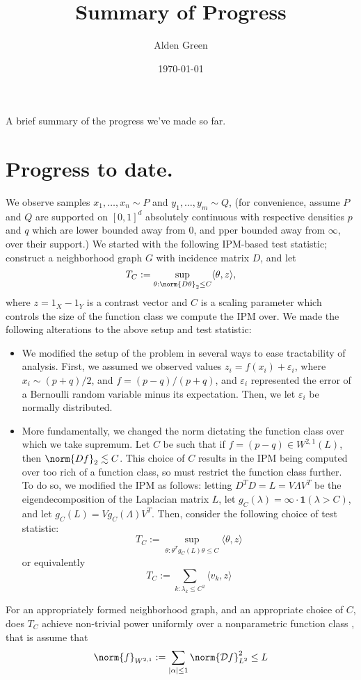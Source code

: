 \documentclass{article}
\newcommand{\abs}[1]{\left \lvert #1 \right \rvert}
\newcommand{\dotp}[2]{\langle #1, #2 \rangle}
\newcommand{\1}{\mathbf{1}}
\newcommand{\Partial}{\mathcal{D}}
\theoremstyle{alden}
\theoremstyle{aldenthm}
\theoremstyle{definition}
\theoremstyle{remark}
\begin{document}
\title{Summary of Progress}
\author{Alden Green}
\date{\today}
\maketitle

A brief summary of the progress we've made so far.
\section{Progress to date.}
We observe samples $x_1,\ldots,x_n \sim P$ and $y_1,\ldots,y_m \sim Q$, (for convenience, assume $P$ and $Q$ are supported on $[0,1]^d$ absolutely continuous with respective densities $p$ and $q$ which are lower bounded away from $0$, and pper bounded away from $\infty$, over their support.) We started with the following IPM-based test statistic; construct a neighborhood graph $G$ with incidence matrix $D$, and let
\begin{equation*}
T_C := \sup_{\theta: \norm{D\theta}_2 \leq C} \dotp{\theta}{z},
\end{equation*}
where $z = 1_X - 1_Y$ is a contrast vector and $C$ is a scaling parameter which controls the size of the function class we compute the IPM over. We made the following alterations to the above setup and test statistic:
\begin{itemize}
	\item We modified the setup of the problem in several ways to ease tractability of analysis. First, we assumed we observed values $z_i = f(x_i) + \varepsilon_i$, where $x_i \sim (p + q)/2$, and $f = (p - q)/(p + q)$, and $\varepsilon_i$ represented the error of a Bernoulli random variable minus its expectation. Then, we let $\varepsilon_i$ be normally distributed. 
	
	\item More fundamentally, we changed the norm dictating the function class over which we take supremum. Let $C$ be such that if $f = (p - q) \in W^{2,1}(L)$, then $\norm{Df}_2 \lesssim C$. This choice of $C$ results in the IPM being computed over too rich of a function class, so must restrict the function class further. To do so, we modified the IPM as follows: letting $D^T D = L = V \Lambda V^T$ be the eigendecomposition of the Laplacian matrix $L$, let $g_C(\lambda) = \infty \cdot \1(\lambda > C)$, and let $g_C(L) = V g_C(\Lambda) V^T$. Then, consider the following choice of test statistic:
	\begin{equation*}
	T_C := \sup_{\theta: \theta^T g_C(L) \theta \leq C} \dotp{\theta}{z}
	\end{equation*}
	or equivalently
	\begin{equation*}
	T_C := \sum_{k: \lambda_k \leq C^2} \dotp{v_k}{z} 
	\end{equation*}
\end{itemize}

For an appropriately formed neighborhood graph, and an appropriate choice of $C$, does $T_C$ achieve non-trivial power uniformly over a nonparametric function class , that is assume that
\begin{equation*}
\norm{f}_{W^{2,1}} := \sum_{\abs{\alpha} \leq 1} \norm{\Partial f}_{L^2}^2 \leq L
\end{equation*}
\end{document}
